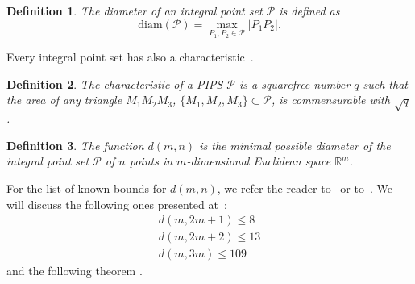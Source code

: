 \documentclass[12pt]{article}
\theoremstyle{theorem}
\theoremstyle{dfn}
\newtheorem{dfn}{Definition}
\theoremstyle{remark}
\begin{document}
\begin{dfn}
	The diameter of an integral point set $\mathcal{P}$ is defined as
	\begin{equation}
		\operatorname{diam(\mathcal{P})} = \underset{P_{1}, P_{2} \in
		\mathcal{P}}{\max} |P_{1}P_{2}|
		.
	\end{equation}
\end{dfn}

Every integral point set has also a characteristic~\cite{kemnitz1988punktmengen,kurz2005characteristic}.

\begin{dfn}
	The characteristic of a PIPS $\mathcal{P}$ is a squarefree number $q$
	such that the area of any triangle $M_1M_2M_3$, $\{M_1,M_2,M_3\}\subset \mathcal{P}$,
	is commensurable with $\sqrt{q}$.
\end{dfn}


\begin{dfn}
	The function $d(m, n)$ is the minimal possible diameter of
	the integral point set $\mathcal{P}$ of $n$ points in
	$m$-dimensional Euclidean space $\mathbb{R}^{m}$.
\end{dfn}


%


For the list of known bounds for $d(m, n)$,
we refer the reader to~\cite[Theorem 1]{kurz2008bounds} or to~\cite{our-vmmsh-2018}.
We will discuss the following ones presented at~\cite{kurz2008bounds}:
\begin{align}
	d(m, 2m + 1) \leq 8\\
	d(m, 2m + 2) \leq 13 \label{eq:d_m_2m+2}\\
	d(m, 3m) \leq 109
\end{align}
and the following theorem \cite[Theorem 2.1]{kurz2008bounds}.
\end{document}
